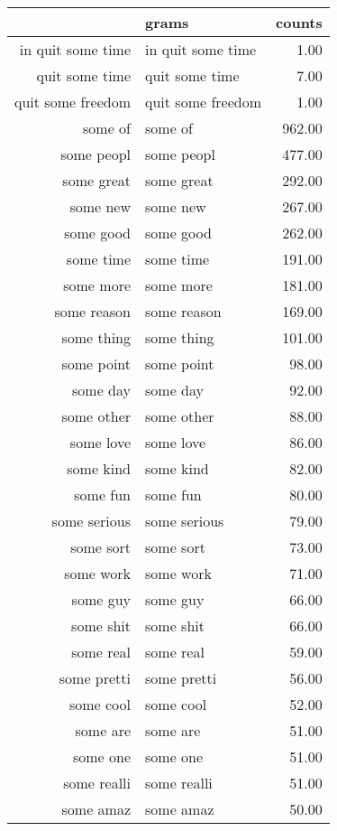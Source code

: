 \begin{table}[ht]
\centering
\begin{tabular}{rlr}
  \hline
 & grams & counts \\ 
  \hline
in quit some time & in quit some time & 1.00 \\ 
  quit some time & quit some time & 7.00 \\ 
  quit some freedom & quit some freedom & 1.00 \\ 
  some of & some of & 962.00 \\ 
  some peopl & some peopl & 477.00 \\ 
  some great & some great & 292.00 \\ 
  some new & some new & 267.00 \\ 
  some good & some good & 262.00 \\ 
  some time & some time & 191.00 \\ 
  some more & some more & 181.00 \\ 
  some reason & some reason & 169.00 \\ 
  some thing & some thing & 101.00 \\ 
  some point & some point & 98.00 \\ 
  some day & some day & 92.00 \\ 
  some other & some other & 88.00 \\ 
  some love & some love & 86.00 \\ 
  some kind & some kind & 82.00 \\ 
  some fun & some fun & 80.00 \\ 
  some serious & some serious & 79.00 \\ 
  some sort & some sort & 73.00 \\ 
  some work & some work & 71.00 \\ 
  some guy & some guy & 66.00 \\ 
  some shit & some shit & 66.00 \\ 
  some real & some real & 59.00 \\ 
  some pretti & some pretti & 56.00 \\ 
  some cool & some cool & 52.00 \\ 
  some are & some are & 51.00 \\ 
  some one & some one & 51.00 \\ 
  some realli & some realli & 51.00 \\ 
  some amaz & some amaz & 50.00 \\ 

\end{tabular}
\end{table}
